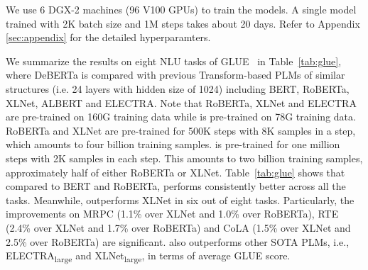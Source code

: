 We use 6 DGX-2 machines (96 V100 GPUs) to train the models. 
A single model trained with 2K batch size and 1M steps takes about 20 days.
Refer to Appendix \ref{sec:appendix} for the detailed hyperparamters. 


We summarize the results on eight NLU tasks of GLUE~\citep{wang2018glue} in Table~\ref{tab:glue}, where DeBERTa is compared {\ModelName} with previous Transform-based PLMs of similar structures (i.e. 24 layers with hidden size of 1024) including BERT, RoBERTa, XLNet, ALBERT and ELECTRA.
Note that RoBERTa, XLNet and ELECTRA are pre-trained on 160G training data while {\ModelName} is pre-trained on 78G training data. RoBERTa and XLNet are pre-trained for 500K steps with 8K samples in a step, which amounts to four billion training samples. 
{\ModelName} is pre-trained for one million steps with 2K samples in each step.  
This amounts to two billion training samples, approximately half of either RoBERTa or XLNet.  
Table~\ref{tab:glue} shows that compared to BERT and RoBERTa, {\ModelName} performs consistently better across all the tasks. 
Meanwhile, {\ModelName} outperforms XLNet in six out of eight tasks. 
Particularly, the improvements on MRPC (1.1\% over XLNet and 1.0\% over RoBERTa), RTE (2.4\% over XLNet and 1.7\% over RoBERTa) and CoLA (1.5\% over XLNet and 2.5\% over RoBERTa) are significant. 
{\ModelName} also outperforms other SOTA PLMs, i.e., ELECTRA\textsubscript{large} and XLNet\textsubscript{large}, in terms of average GLUE score.  


